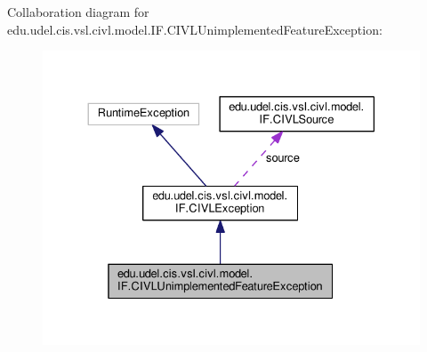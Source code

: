 Collaboration diagram for edu.\+udel.\+cis.\+vsl.\+civl.\+model.\+I\+F.\+C\+I\+V\+L\+Unimplemented\+Feature\+Exception\+:
\nopagebreak
\begin{figure}[H]
\begin{center}
\leavevmode
\includegraphics[width=330pt]{classedu_1_1udel_1_1cis_1_1vsl_1_1civl_1_1model_1_1IF_1_1CIVLUnimplementedFeatureException__coll__graph}
\end{center}
\end{figure}

